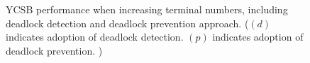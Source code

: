 \documentclass[conference]{IEEEtran}
\begin{document}
\begin{figure}[tbp]
  \centering
      \caption{YCSB performance when increasing terminal numbers, including deadlock detection and deadlock prevention approach.
      ($(d)$ indicates adoption of deadlock detection. $(p)$ indicates adoption of deadlock prevention. ) }
      \label{fig:ycsb_deadlock}

\end{figure}
\end{document}
